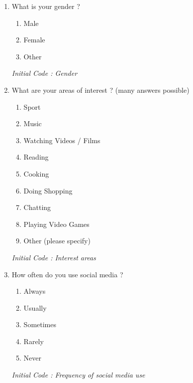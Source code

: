 \documentclass[conference]{IEEEtran}
\begin{document}
\begin{enumerate}
    \setlength\itemsep{1em}
    \item What is your gender ?
    \begin{enumerate}
        \item Male
        \item Female
        \item Other
    \end{enumerate}
    \textit{Initial Code : Gender}

    \item What are your areas of interest ? (many answers possible)
    \begin{enumerate}
        \item Sport
        \item Music
        \item Watching Videos / Films
        \item Reading
        \item Cooking
        \item Doing Shopping
        \item Chatting
        \item Playing Video Games
        \item Other (please specify)
    \end{enumerate}
    \textit{Initial Code : Interest areas}

    \item How often do you use social media ?
    \begin{enumerate}
        \item Always
        \item Usually
        \item Sometimes
        \item Rarely
        \item Never
    \end{enumerate}
    \textit{Initial Code : Frequency of social media use}


\end{enumerate}
\end{document}
